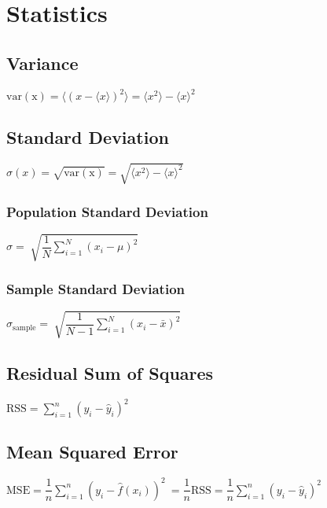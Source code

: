\chapter{Statistics}



	\section{Variance}
\begin{itemize}
\itemt \( \mathrm{var(x)} = \langle (x - \langle x \rangle)^2 \rangle =\langle x^2 \rangle - \langle x \rangle^2 \)
\end{itemize}		


	\section{Standard Deviation}
\begin{itemize}
\itemt \( \sigma(x) = \sqrt{\mathrm{var(x)}} = \sqrt{\langle x^2 \rangle - \langle x \rangle^2} \)
\end{itemize}

		\subsection{Population Standard Deviation}
\begin{itemize}
\itemt \( \sigma = \sqrt[]{\dfrac{1}{N} \sum\limits^N_{i=1}(x_i - \mu)^2} \)
\end{itemize}

		\subsection{Sample Standard Deviation}
\begin{itemize}
\itemt \( \sigma_\mathrm{sample} = \sqrt[]{\dfrac{1}{N-1} \sum\limits^N_{i=1}(x_i - \bar{x})^2} \)
\end{itemize}

	\section{Residual Sum of Squares}
\begin{itemize}
\itemt \( \mathrm{RSS} = \sum\limits_{i=1}^n (y_i - \hat{y}_i)^2 \)
\end{itemize}


	\section{Mean Squared Error}
\begin{itemize}
\itemt \( \mathrm{MSE} = \dfrac{1}{n}\sum\limits_{i=1}^n (y_i - \hat{f}(x_i))^2 \ = \dfrac{1}{n}\mathrm{RSS} = \dfrac{1}{n}\sum\limits_{i=1}^n (y_i - \hat{y}_i)^2 \)
\end{itemize}


